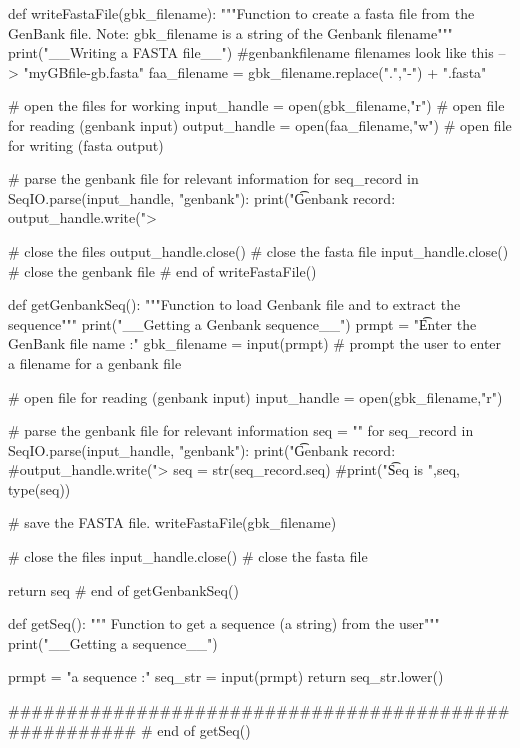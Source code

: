 def writeFastaFile(gbk_filename):
    """Function to create a fasta file from the GenBank file. Note: gbk_filename is a string of the Genbank filename"""
    print("\n__Writing a FASTA file__")
    #genbankfilename  filenames look like this --> "myGBfile-gb.fasta"
    faa_filename = gbk_filename.replace(".","-") + ".fasta"

    # open the files for working
    input_handle = open(gbk_filename,"r") # open file for reading (genbank input)
    output_handle = open(faa_filename,"w") # open file for writing (fasta output)

    # parse the genbank file for relevant information
    for seq_record in SeqIO.parse(input_handle, "genbank"):
        print("\t Genbank record: %
        output_handle.write(">%

    # close the files
    output_handle.close() # close the fasta file
    input_handle.close() # close the genbank file
# end of writeFastaFile()


def getGenbankSeq():
    """Function to load Genbank file and to extract the sequence"""
    print("\n__Getting a Genbank sequence__")
    prmpt = "\t Enter the GenBank file name :"
    gbk_filename = input(prmpt) # prompt the user to enter a filename for a genbank file

    # open file for reading (genbank input)
    input_handle = open(gbk_filename,"r")

    # parse the genbank file for relevant information
    seq = ""
    for seq_record in SeqIO.parse(input_handle, "genbank"):
        print("\t Genbank record: %
        #output_handle.write(">%
        seq = str(seq_record.seq)
    #print("\t Seq is ",seq, type(seq))

    # save the FASTA file.
    writeFastaFile(gbk_filename)

    # close the files
    input_handle.close() # close the fasta file

    return seq
# end of getGenbankSeq()


def getSeq():
    """ Function to get a sequence (a string) from the user"""
    print("\n__Getting a sequence__")

    prmpt = "\tEnter a sequence :"
    seq_str = input(prmpt)
    return seq_str.lower()

######################################################
# end of getSeq()


